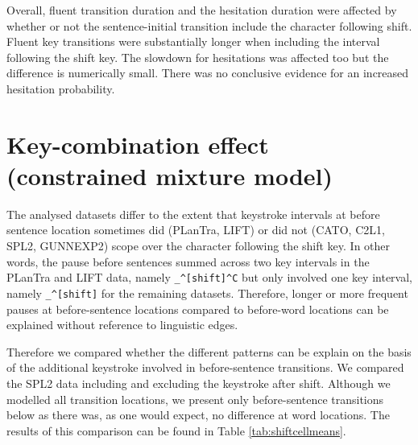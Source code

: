 \documentclass[
  man,floatsintext]{apa7}
\begin{document}
Overall, fluent transition duration and the hesitation duration were affected by whether or not the sentence-initial transition include the character following shift. Fluent key transitions were substantially longer when including the interval following the shift key. The slowdown for hesitations was affected too but the difference is numerically small. There was no conclusive evidence for an increased hesitation probability.

\newpage

\hypertarget{key-combination-effect-constrained-mixture-model}{%
\section{Key-combination effect (constrained mixture model)}\label{key-combination-effect-constrained-mixture-model}}

The analysed datasets differ to the extent that keystroke intervals at before sentence location sometimes did (PLanTra, LIFT) or did not (CATO, C2L1, SPL2, GUNNEXP2) scope over the character following the shift key. In other words, the pause before sentences summed across two key intervals in the PLanTra and LIFT data, namely \texttt{\_\^{}{[}shift{]}\^{}C} but only involved one key interval, namely \texttt{\_\^{}{[}shift{]}} for the remaining datasets. Therefore, longer or more frequent pauses at before-sentence locations compared to before-word locations can be explained without reference to linguistic edges.

Therefore we compared whether the different patterns can be explain on the basis of the additional keystroke involved in before-sentence transitions. We compared the SPL2 data including and excluding the keystroke after shift. Although we modelled all transition locations, we present only before-sentence transitions below as there was, as one would expect, no difference at word locations. The results of this comparison can be found in Table \ref{tab:shiftcellmeans}.
\end{document}
